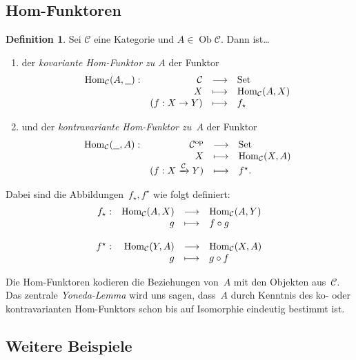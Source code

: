 \documentclass[a4paper,ngerman]{scrartcl}
\theoremstyle{definition}
\newtheorem{defn}{Definition}[section]
\theoremstyle{plain}
\theoremstyle{remark}
\newcommand{\xra}[1]{\xrightarrow{#1}}
\newcommand{\C}{\mathcal{C}}
\newcommand{\Hom}{\mathrm{Hom}}
\newcommand{\freist}{\underline{\ \ }}
\DeclareMathOperator{\Ob}{Ob}
\newcommand{\op}{\mathrm{op}}
\newcommand{\Set}{\mathrm{Set}}
\begin{document}
\subsection{Hom-Funktoren}

\begin{defn}
Sei $\C$ eine Kategorie und $A \in \Ob \C$. Dann ist\ldots
\begin{enumerate}
  \item der \emph{kovariante Hom-Funktor zu $A$} der Funktor
    \[ \begin{array}{@{}rrcl@{}}
      \Hom_\C(A,\freist): & \C &\longrightarrow& \Set \\
      & X &\longmapsto& \Hom_\C(A,X) \\
      & (f:X \to Y) &\longmapsto& f_\star
    \end{array} \]
  \item und der \emph{kontravariante Hom-Funktor zu~$A$} der Funktor
    \[ \begin{array}{@{}rrcl@{}}
      \Hom_\C(\freist,A): & \C^\op &\longrightarrow& \Set \\
      & X &\longmapsto& \Hom_\C(X,A) \\
      & (f:X \xra{\C} Y) &\longmapsto& f^\star.
    \end{array} \]
\end{enumerate}
Dabei sind die Abbildungen~$f_\star, f^\star$ wie folgt definiert:
\[ \begin{array}{@{}rrcl@{}}
  f_\star: & \Hom_\C(A,X) &\longrightarrow& \Hom_\C(A,Y) \\
  & g &\longmapsto& f \circ g \\
  \\
  f^\star: & \Hom_\C(Y,A) &\longrightarrow& \Hom_\C(X,A) \\
  & g &\longmapsto& g \circ f
\end{array} \]
\end{defn}

Die Hom-Funktoren kodieren die Beziehungen von~$A$ mit den Objekten aus~$\C$.
Das zentrale \emph{Yoneda-Lemma} wird uns sagen, dass~$A$ durch Kenntnis des
ko- oder kontravarianten Hom-Funktors schon bis auf Isomorphie eindeutig
bestimmt ist.


\subsection{Weitere Beispiele}
\end{document}
